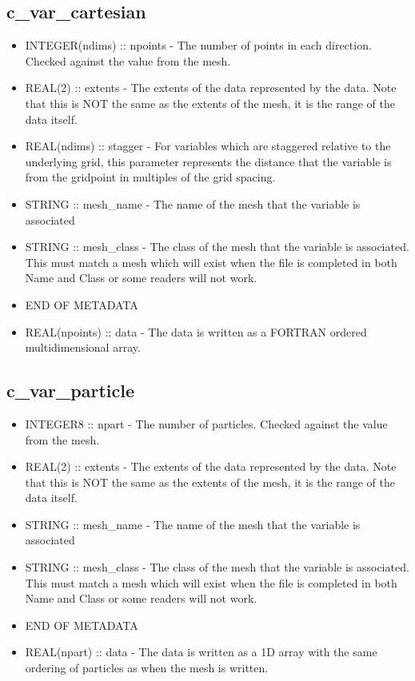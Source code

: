 \documentclass[8pt]{article}
\begin{document}
\subsection{c\_var\_cartesian}
\begin{itemize}
\item  INTEGER(ndims) :: npoints - The number of points in each direction. Checked against the value from the mesh.
\item  REAL(2)  :: extents - The extents of the data represented by the data. Note that this is NOT the same as the extents of the mesh, it is the range of the data itself.
\item  REAL(ndims) :: stagger - For variables which are staggered relative to the underlying grid, this parameter represents the distance that the variable is from the gridpoint in multiples of the grid spacing.
\item STRING :: mesh\_name - The name of the mesh that the variable is associated
\item STRING :: mesh\_class - The class of the mesh that the variable is associated. This must match a mesh which will exist when the file is completed in both Name and Class or some readers will not work.
\item END OF METADATA
\item REAL(npoints) :: data - The data is written as a FORTRAN ordered multidimensional array.
\end{itemize}
\subsection{c\_var\_particle}
\begin{itemize}
\item  INTEGER8 :: npart - The number of particles. Checked against the value from the mesh.
\item  REAL(2)  :: extents - The extents of the data represented by the data. Note that this is NOT the same as the extents of the mesh, it is the range of the data itself.
\item STRING :: mesh\_name - The name of the mesh that the variable is associated
\item STRING :: mesh\_class - The class of the mesh that the variable is associated. This must match a mesh which will exist when the file is completed in both Name and Class or some readers will not work.
\item END OF METADATA
\item REAL(npart) :: data - The data is written as a 1D array with the same ordering of particles as when the mesh is written.
\end{itemize}
\end{document}
